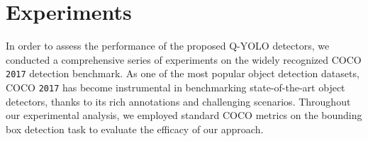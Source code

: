 \documentclass[runningheads]{llncs}
\begin{document}

%
\section{Experiments}
In order to assess the performance of the proposed Q-YOLO detectors, we conducted a comprehensive series of experiments on the widely recognized COCO {\tt 2017} \cite{lin2014microsoft} detection benchmark. As one of the most popular object detection datasets, COCO {\tt 2017} \cite{lin2014microsoft} has become instrumental in benchmarking state-of-the-art object detectors, thanks to its rich annotations and challenging scenarios. Throughout our experimental analysis, we employed standard COCO metrics on the bounding box detection task to evaluate the efficacy of our approach.
\end{document}
